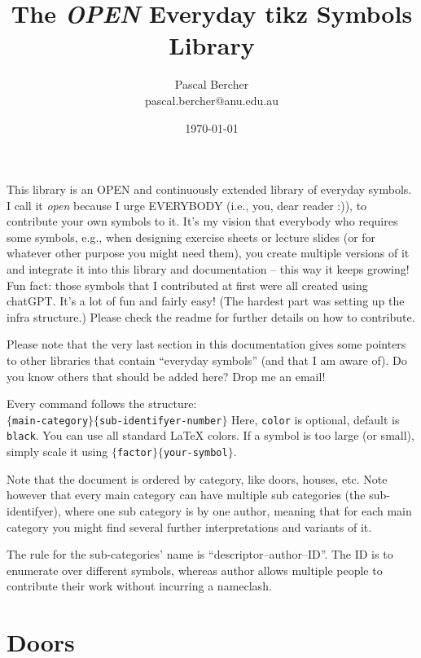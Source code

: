 \documentclass{article}
\begin{document}
\title{The \emph{OPEN} Everyday tikz Symbols Library}
\author{Pascal Bercher\\pascal.bercher@anu.edu.au}
\date{\today}

\maketitle

This library is an OPEN and continuously extended library of everyday symbols. I call it \emph{open} because I urge EVERYBODY (i.e., you, dear reader :)), to contribute your own symbols to it. It's my vision that everybody who requires some symbols, e.g., when designing exercise sheets or lecture slides (or for whatever other purpose you might need them), you create multiple versions of it and integrate it into this library and documentation -- this way it keeps growing! Fun fact: those symbols that I contributed at first were all created using chatGPT. It's a lot of fun and fairly easy! (The hardest part was setting up the infra structure.) Please check the readme for further details on how to contribute.

Please note that the very last section in this documentation gives some pointers to other libraries that contain ``everyday symbols'' (and that I am aware of). Do you know others that should be added here? Drop me an email!

\smallskip
Every command follows the structure:\\
{\centering
\texttt{\string\everydaySymbol[color]$\{$main-category$\}\{$sub-identifyer-number$\}$}}
Here, \texttt{color} is optional, default is \texttt{black}. You can use all standard \LaTeX{} colors. If a symbol is too large (or small), simply scale it using
\texttt{\string\scalebox$\{$factor$\}\{$your-symbol$\}$}.

\smallskip
Note that the document is ordered by category, like doors, houses, etc. Note however that every main category can have multiple sub categories (the sub-identifyer), where one sub category is by one author, meaning that for each main category you might find several further interpretations and variants of it. 

\smallskip
The rule for the sub-categories' name is ``descriptor--author--ID''. The ID is to enumerate over different symbols, whereas author allows multiple people to contribute their work without incurring a nameclash.

\section{Doors}
\end{document}
